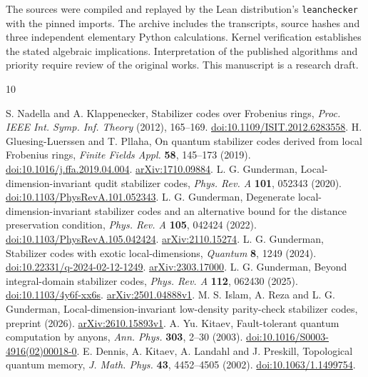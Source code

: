 \documentclass[11pt]{article}
\begin{document}
The sources were compiled and replayed by the Lean distribution's \texttt{leanchecker} with the pinned imports. The archive includes the transcripts, source hashes and three independent elementary Python calculations. Kernel verification establishes the stated algebraic implications. Interpretation of the published algorithms and priority require review of the original works. This manuscript is a research draft.
\begin{thebibliography}{10}\small\raggedright\setlength{\itemsep}{2pt}
 S. Nadella and A. Klappenecker, Stabilizer codes over Frobenius rings, \emph{Proc. IEEE Int. Symp. Inf. Theory} (2012), 165--169. \href{https://doi.org/10.1109/ISIT.2012.6283558}{doi:10.1109/ISIT.2012.6283558}.
 H. Gluesing-Luerssen and T. Pllaha, On quantum stabilizer codes derived from local Frobenius rings, \emph{Finite Fields Appl.} \textbf{58}, 145--173 (2019). \href{https://doi.org/10.1016/j.ffa.2019.04.004}{doi:10.1016/j.ffa.2019.04.004}. \href{https://arxiv.org/abs/1710.09884}{arXiv:1710.09884}.
 L. G. Gunderman, Local-dimension-invariant qudit stabilizer codes, \emph{Phys. Rev. A} \textbf{101}, 052343 (2020). \href{https://doi.org/10.1103/PhysRevA.101.052343}{doi:10.1103/PhysRevA.101.052343}.
 L. G. Gunderman, Degenerate local-dimension-invariant stabilizer codes and an alternative bound for the distance preservation condition, \emph{Phys. Rev. A} \textbf{105}, 042424 (2022). \href{https://doi.org/10.1103/PhysRevA.105.042424}{doi:10.1103/PhysRevA.105.042424}. \href{https://arxiv.org/abs/2110.15274}{arXiv:2110.15274}.
 L. G. Gunderman, Stabilizer codes with exotic local-dimensions, \emph{Quantum} \textbf{8}, 1249 (2024). \href{https://doi.org/10.22331/q-2024-02-12-1249}{doi:10.22331/q-2024-02-12-1249}. \href{https://arxiv.org/abs/2303.17000}{arXiv:2303.17000}.
 L. G. Gunderman, Beyond integral-domain stabilizer codes, \emph{Phys. Rev. A} \textbf{112}, 062430 (2025). \href{https://doi.org/10.1103/4y6f-xx6s}{doi:10.1103/4y6f-xx6s}. \href{https://arxiv.org/abs/2501.04888v1}{arXiv:2501.04888v1}.
 M. S. Islam, A. Reza and L. G. Gunderman, Local-dimension-invariant low-density parity-check stabilizer codes, preprint (2026). \href{https://arxiv.org/abs/2610.15893}{arXiv:2610.15893v1}.
 A. Yu. Kitaev, Fault-tolerant quantum computation by anyons, \emph{Ann. Phys.} \textbf{303}, 2--30 (2003). \href{https://doi.org/10.1016/S0003-4916(02)00018-0}{doi:10.1016/S0003-4916(02)00018-0}.
 E. Dennis, A. Kitaev, A. Landahl and J. Preskill, Topological quantum memory, \emph{J. Math. Phys.} \textbf{43}, 4452--4505 (2002). \href{https://doi.org/10.1063/1.1499754}{doi:10.1063/1.1499754}.

\end{thebibliography}
\end{document}
